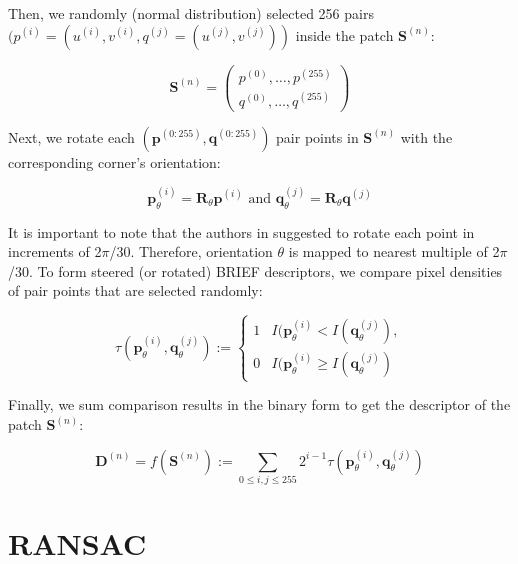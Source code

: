 \documentclass[a4paper]{report}
\numberwithin{figure}{section}
\begin{document}
\begin{appendices}
\begin{enumerate}
	
	Then, we randomly (normal distribution) selected 256 pairs 
	$(p^{(i)}=(u^{(i)},v^{(i)},q^{(j)}=(u^{(j)},v^{(j)}))$ inside the patch 
	$\mathbf{S}^{(n)}$:
	
	\begin{equation}
	\mathbf{S}^{(n)} = 
	\begin{pmatrix}
	p^{(0)}, \dots, p^{(255)}\\
	q^{(0)}, \dots, q^{(255)}
	\end{pmatrix}
	\end{equation}
	
	Next, we rotate each $(\mathbf{p}^{(0:255)}, \mathbf{q}^{(0:255)})$ pair 
	points in $\mathbf{S}^{(n)}$ with the corresponding corner's orientation:
	
	\begin{equation}
	\mathbf{p}^{(i)}_{\theta} = \mathbf{R}_{\theta}\mathbf{p}^{(i)} \text{ and 
	} 
	\mathbf{q}^{(j)}_{\theta} = \mathbf{R}_{\theta}\mathbf{q}^{(j)}
	\end{equation}
	
	It is important to note that the authors in \parencite{Rublee2011a} 
	suggested 
	to rotate each point in increments of 2$\pi$/30. Therefore, orientation 
	$\theta$ is mapped to nearest multiple of 2$\pi$/30. To form steered (or 
	rotated) BRIEF descriptors, we compare pixel densities of pair points that 
	are selected randomly:
	
	\begin{equation*}
	\tau(\mathbf{p}^{(i)}_{\theta},\mathbf{q}^{(j)}_{\theta}) := 
	\begin{cases}
	1  & I(\mathbf{p}^{(i)}_{\theta} < I(\mathbf{q}^{(j)}_{\theta}),\\
	0  & I(\mathbf{p}^{(i)}_{\theta} \geq I(\mathbf{q}^{(j)}_{\theta})
	\end{cases}
	\end{equation*}
	
	Finally, we sum comparison results in the binary form to get the 
	descriptor  
	of the patch $\mathbf{S}^{(n)}$:
	
	\begin{equation}
	\mathbf{D}^{(n)} = f(\mathbf{S}^{(n)}) := \sum_{0\leq i,j \leq 255} 
	2^{i-1}\tau (\mathbf{p}^{(i)}_{\theta},\mathbf{q}^{(j)}_{\theta})
	\end{equation}
	
\end{enumerate}


\section{RANSAC} \label{sb_sc_ransac_app}


\end{appendices}
\end{document}
